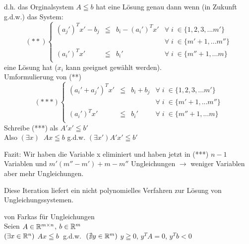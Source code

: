 d.h. das Orginalsystem $A \leqq b$ hat eine Lösung genau dann wenn (in
Zukunft g.d.w.) das System:
\[
(**)\left\{\begin{array}{rcll}
(a_{j}')^{T}x' -b_{j} &\leqq& b_{i} - (a_{i}')^{T}x'& \forall \; i \; \in
\{1,2,3,...m'\}\\
&&&\forall \; i \; \in
\{m'+1,...m''\}\\
(a_{i}')^{T}x' &\leqq& b_{i}'& \forall \; i \; \in
\{m''+1,...m\}\\
\end{array}\right.
\]
eine Lösung hat ($x_{i}$ kann geeignet gewählt werden).\\
Umformulierung von (**)
\[
(***)\left\{\begin{array}{rcll}
(a_{i}'+a_{j}')^{T} x' &\leqq& b_{i} + b_{j}& \forall \; i \; \in
\{1,2,3,...m'\}\\
&&& \forall \; i \; \in
\{m'+1,...m''\}\\
(a_{i}')^{T}x' &\leqq& b_{i}'& \forall \; i \; \in
\{m''+1,...m\}\\
\end{array}\right.
\]
Schreibe (***) als $A'x'\leqq b'$\\
Also $(\exists x) \; \; A x\leqq b$ g.d.w. $(\exists x') A' x' \leqq b'$

Fazit: Wir haben die Variable x eliminiert und haben jetzt in (***) $n-1$
Variablen und $m'(m''-m')+m-m''$ Ungleichungen $\rightarrow$ weniger
Variablen aber mehr Ungleichungen.

Diese Iteration liefert ein nicht polynomielles Verfahren zur Lösung von
Ungleichungssystemen.

\begin{lemma}
von Farkas für Ungleichungen\\
Seien $A \in \mathbb{R}^{m\times n}$, $b\in \mathbb{R}^{m}$\\
$(\exists x \in \mathbb{R}^{n})$ $A x \leqq b\;$ g.d.w. $\;(\nexists y \in \mathbb{R}^{m})$
$y\geqq 0$, $y^{T}A=0$, $y^{T}b < 0$\\
\end{lemma}

